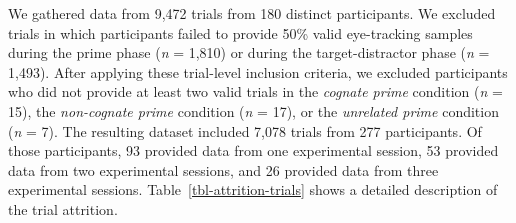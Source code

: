 \documentclass[
  letterpaper,
  DIV=11,
  numbers=noendperiod]{scrartcl}
\begin{document}
We gathered data from 9,472 trials from 180 distinct participants. We
excluded trials in which participants failed to provide 50\% valid
eye-tracking samples during the prime phase (\emph{n} = 1,810) or during
the target-distractor phase (\emph{n} = 1,493). After applying these
trial-level inclusion criteria, we excluded participants who did not
provide at least two valid trials in the \emph{cognate prime} condition
(\emph{n} = 15), the \emph{non-cognate prime} condition (\emph{n} = 17),
or the \emph{unrelated prime} condition (\emph{n} = 7). The resulting
dataset included 7,078 trials from 277 participants. Of those
participants, 93 provided data from one experimental session, 53
provided data from two experimental sessions, and 26 provided data from
three experimental sessions. Table~\ref{tbl-attrition-trials} shows a
detailed description of the trial attrition.
\end{document}
